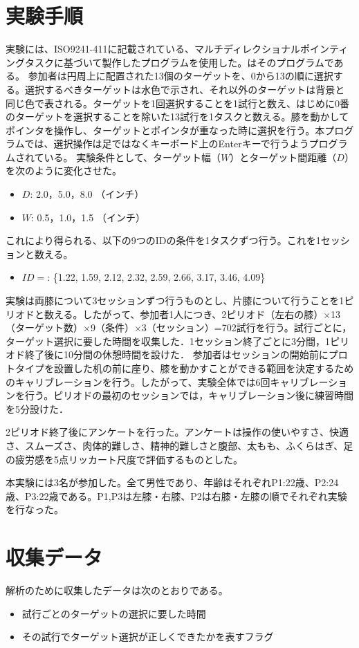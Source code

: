 \section{実験手順}
実験には、ISO9241-411に記載されている、マルチディレクショナルポインティングタスクに基づいて製作したプログラムを使用した。はそのプログラムである。
参加者は円周上に配置された13個のターゲットを、0から13の順に選択する。選択するべきターゲットは水色で示され、それ以外のターゲットは背景と同じ色で表される。ターゲットを1回選択することを1試行と数え、はじめに0番のターゲットを選択することを除いた13試行を1タスクと数える。膝を動かしてポインタを操作し、ターゲットとポインタが重なった時に選択を行う。本プログラムでは、選択操作は足ではなくキーボード上のEnterキーで行うようプログラムされている。
実験条件として、ターゲット幅（$W$）とターゲット間距離（$D$）を次のように変化させた。
\begin{itemize}
	\item $D$: 2.0，5.0，8.0 （インチ）
	\item $W$: 0.5，1.0，1.5 （インチ）
\end{itemize}
これにより得られる、以下の9つのIDの条件を1タスクずつ行う。これを1セッションと数える。
\begin{itemize}
	\item $ID = $: \{1.22, 1.59, 2.12, 2.32, 2.59, 2.66, 3.17,  3.46, 4.09\}
\end{itemize}
実験は両膝について3セッションずつ行うものとし、片膝について行うことを1ピリオドと数える。したがって、参加者1人につき、2ピリオド（左右の膝）$\times$13（ターゲット数）$\times$9（条件）$\times$3（セッション）=702試行を行う。試行ごとに，ターゲット選択に要した時間を収集した．1セッション終了ごとに3分間，1ピリオド終了後に10分間の休憩時間を設けた．
参加者はセッションの開始前にプロトタイプを設置した机の前に座り、膝を動かすことができる範囲を決定するためのキャリブレーションを行う。したがって、実験全体では6回キャリブレーションを行う。ピリオドの最初のセッションでは，キャリブレーション後に練習時間を5分設けた．

2ピリオド終了後にアンケートを行った。アンケートは操作の使いやすさ、快適さ、スムーズさ、肉体的難しさ、精神的難しさと腹部、太もも、ふくらはぎ、足の疲労感を5点リッカート尺度で評価するものとした。

本実験には3名が参加した。全て男性であり、年齢はそれぞれP1:22歳、P2:24歳、P3:22歳である。P1,P3は左膝・右膝、P2は右膝・左膝の順でそれぞれ実験を行なった。
\section{収集データ}
解析のために収集したデータは次のとおりである。
\begin{itemize}
	\item 試行ごとのターゲットの選択に要した時間
	\item その試行でターゲット選択が正しくできたかを表すフラグ
\end{itemize}


